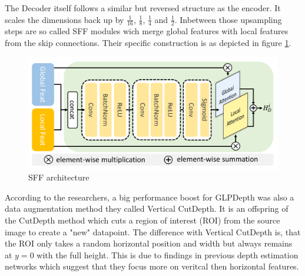 The Decoder itself follows a similar but reversed structure as the encoder. It scales the dimensions back up by $\frac{1}{16}$, $\frac{1}{8}$, $\frac{1}{4}$ and $\frac{1}{2}$. Inbetween those upsampling steps are so called SFF modules wich merge global features with local features from the skip connections. Their specific construction is as depicted in figure \ref*{SFF_arch}.

\begin{figure}[ht]
    \begin{center}
        \includegraphics*[scale=.2, pagebox=artbox]{resources/SFF.png}
        \caption{SFF architecture} \label{SFF_arch}
    \end{center}
\end{figure}

According to the researchers, a big performance boost for GLPDepth was also a data augmentation method they called Vertical CutDepth. It is an offspring of the CutDepth method
which cuts a region of interest (ROI) from the source image to create a "new" datapoint. The difference with Vertical CutDepth is, that the ROI only takes a random horizontal position and width but always remains at $y=0$ with the full height. This is due to findings 
in previous depth estimation networks which suggest that they focus more on veritcal then horizontal features.
